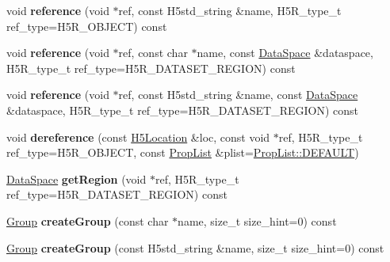 \begin{DoxyCompactItemize}
\mbox{\label{class_h5_1_1_h5_location_a20fadd564b45f02c965f01b767647e32}} 
void {\bfseries reference} (void $\ast$ref, const H5std\+\_\+string \&name, H5\+R\+\_\+type\+\_\+t ref\+\_\+type=H5\+R\+\_\+\+O\+B\+J\+E\+CT) const
\item 
\mbox{\label{class_h5_1_1_h5_location_a1df65b439283aa921b774e588beec215}} 
void {\bfseries reference} (void $\ast$ref, const char $\ast$name, const \hyperlink{class_h5_1_1_data_space}{Data\+Space} \&dataspace, H5\+R\+\_\+type\+\_\+t ref\+\_\+type=H5\+R\+\_\+\+D\+A\+T\+A\+S\+E\+T\+\_\+\+R\+E\+G\+I\+ON) const
\item 
\mbox{\label{class_h5_1_1_h5_location_a6c6b3923a983d32e106f0d3200b07d3e}} 
void {\bfseries reference} (void $\ast$ref, const H5std\+\_\+string \&name, const \hyperlink{class_h5_1_1_data_space}{Data\+Space} \&dataspace, H5\+R\+\_\+type\+\_\+t ref\+\_\+type=H5\+R\+\_\+\+D\+A\+T\+A\+S\+E\+T\+\_\+\+R\+E\+G\+I\+ON) const
\item 
\mbox{\label{class_h5_1_1_h5_location_a43fe9cb23e4ab9dd1004308661be59c3}} 
void {\bfseries dereference} (const \hyperlink{class_h5_1_1_h5_location}{H5\+Location} \&loc, const void $\ast$ref, H5\+R\+\_\+type\+\_\+t ref\+\_\+type=H5\+R\+\_\+\+O\+B\+J\+E\+CT, const \hyperlink{class_h5_1_1_prop_list}{Prop\+List} \&plist=\hyperlink{class_h5_1_1_prop_list_ae52af66ce82af0ea7e6dc57148c56241}{Prop\+List\+::\+D\+E\+F\+A\+U\+LT})
\item 
\mbox{\label{class_h5_1_1_h5_location_ab9d61a6cba26e9d38a0efb127c4faa8f}} 
\hyperlink{class_h5_1_1_data_space}{Data\+Space} {\bfseries get\+Region} (void $\ast$ref, H5\+R\+\_\+type\+\_\+t ref\+\_\+type=H5\+R\+\_\+\+D\+A\+T\+A\+S\+E\+T\+\_\+\+R\+E\+G\+I\+ON) const
\item 
\mbox{\label{class_h5_1_1_h5_location_a115ee67b92c2f84526cf0453a0069254}} 
\hyperlink{class_h5_1_1_group}{Group} {\bfseries create\+Group} (const char $\ast$name, size\+\_\+t size\+\_\+hint=0) const
\item 
\mbox{\label{class_h5_1_1_h5_location_a522fab0a3b5a7a2fc45af8e98c9c3c86}} 
\hyperlink{class_h5_1_1_group}{Group} {\bfseries create\+Group} (const H5std\+\_\+string \&name, size\+\_\+t size\+\_\+hint=0) const

\end{DoxyCompactItemize}
